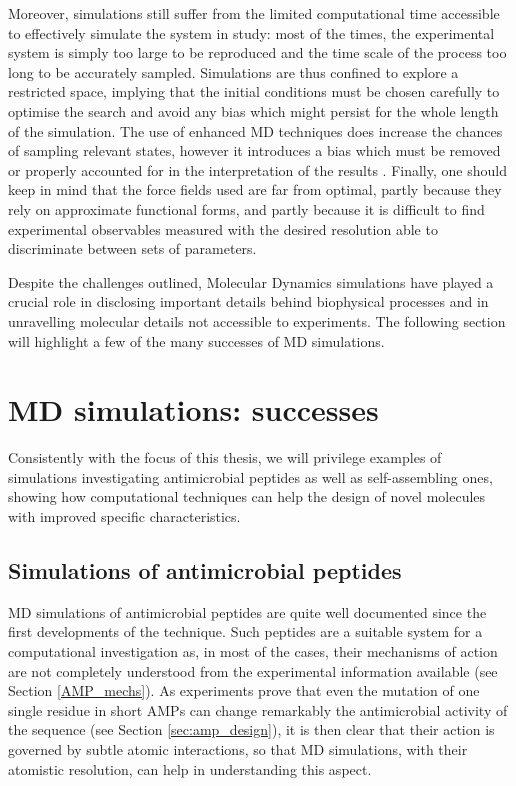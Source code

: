 Moreover, simulations still suffer from the limited computational time accessible to effectively simulate the system in study: most of the times, the experimental system is simply too large to be reproduced and the time scale of the process too long to be accurately sampled. Simulations are thus confined to explore a restricted space, implying that the initial conditions must be chosen carefully to optimise the search and avoid any bias which might persist for the whole length of the simulation. The use of enhanced MD techniques does increase the chances of sampling relevant states, however it introduces a bias which must be removed or properly accounted for in the interpretation of the results \citep{Bernardi2015,Best2005,Barducci2010,Barducci2011,Mills2008}.
Finally, one should keep in mind that the force fields used are far from optimal, partly because they rely on approximate functional forms, and partly because it is difficult to find experimental observables measured with the desired resolution able to discriminate between sets of parameters.

Despite the challenges outlined, Molecular Dynamics simulations have played a crucial role in disclosing important details behind biophysical processes and in unravelling molecular details not accessible to experiments. The following section will highlight a few of the many successes of MD simulations.


\section{MD simulations: successes} \label{sec:md_lit}
Consistently with the focus of this thesis, we will privilege examples of simulations investigating antimicrobial peptides as well as self-assembling ones, showing how computational techniques can help the design of novel molecules with improved specific characteristics.

\subsection{Simulations of antimicrobial peptides}
MD simulations of antimicrobial peptides are quite well documented since the first developments of the technique. Such peptides are a suitable system for a computational investigation as, in most of the cases, their mechanisms of action are not completely understood from the experimental information available (see Section \ref{AMP_mechs}). As experiments prove that even the mutation of one single residue in short AMPs can change remarkably the antimicrobial activity of the sequence (see Section \ref{sec:amp_design}), it is then clear that their action is governed by subtle atomic interactions, so that MD simulations, with their atomistic resolution, can help in understanding this aspect.

